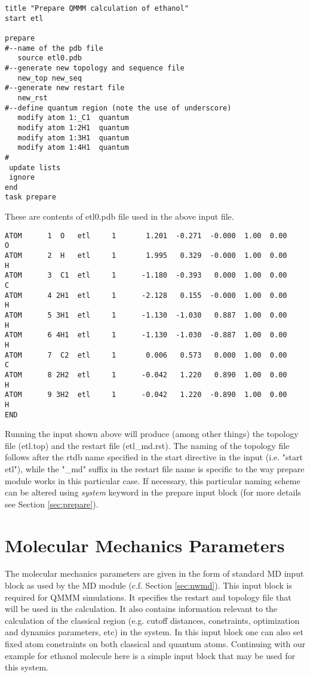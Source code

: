 \begin{verbatim}
title "Prepare QMMM calculation of ethanol"
start etl

prepare
#--name of the pdb file
   source etl0.pdb                    
#--generate new topology and sequence file
   new_top new_seq                    
#--generate new restart file
   new_rst                            
#--define quantum region (note the use of underscore)
   modify atom 1:_C1  quantum         
   modify atom 1:2H1  quantum         
   modify atom 1:3H1  quantum         
   modify atom 1:4H1  quantum         
#
 update lists
 ignore
end
task prepare
\end{verbatim}

These are contents of etl0.pdb file used in the above input file.
\begin{verbatim}
ATOM      1  O   etl     1       1.201  -0.271  -0.000  1.00  0.00           O
ATOM      2  H   etl     1       1.995   0.329  -0.000  1.00  0.00           H
ATOM      3  C1  etl     1      -1.180  -0.393   0.000  1.00  0.00           C
ATOM      4 2H1  etl     1      -2.128   0.155  -0.000  1.00  0.00           H
ATOM      5 3H1  etl     1      -1.130  -1.030   0.887  1.00  0.00           H
ATOM      6 4H1  etl     1      -1.130  -1.030  -0.887  1.00  0.00           H
ATOM      7  C2  etl     1       0.006   0.573   0.000  1.00  0.00           C
ATOM      8 2H2  etl     1      -0.042   1.220   0.890  1.00  0.00           H
ATOM      9 3H2  etl     1      -0.042   1.220  -0.890  1.00  0.00           H
END
\end{verbatim}

Running the input shown above will produce (among other things) the topology file (etl.top) and the restart file
(etl{\_}md.rst). The naming of the topology file follows after the rtdb name specified in the start directive in the input (i.e. "start etl"),
while the "{\_}md" suffix in the restart file name is specific to the way prepare module works in this particular case. If necessary, this
particular naming scheme can be altered using {\it system} keyword in the prepare input block (for more details see Section \ref{sec:prepare}).

\section{Molecular Mechanics Parameters}
The molecular mechanics parameters are given in the form of standard MD input block as
used by the MD module (c.f. Section \ref{sec:nwmd}). This input block
is required for QMMM simulations. It specifies the 
restart and topology file that will be used in the calculation.
It also contains information relevant to the calculation 
of the  classical region 
(e.g. cutoff distances, constraints, optimization and dynamics parameters, etc)
in the system. In this input block one can also set fixed atom constraints on both classical and quantum atoms. Continuing with our
example for ethanol molecule here is a simple input block that may be used for this system.

